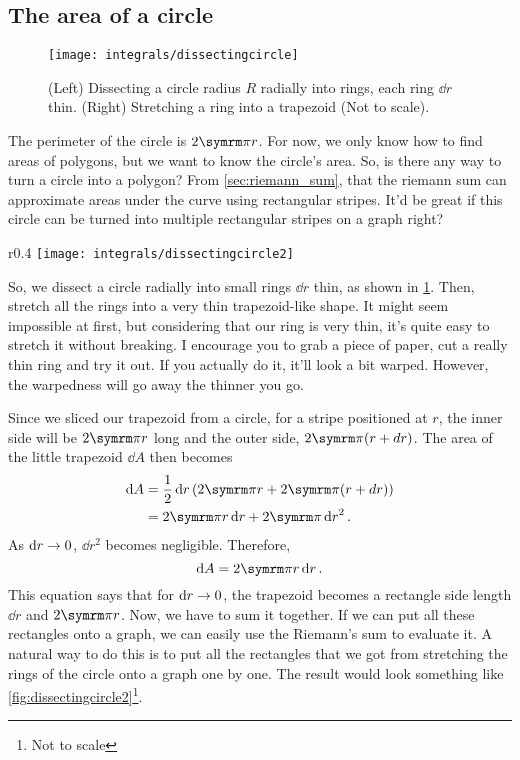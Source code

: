 \subsection{The area of a circle}
\begin{figure}[b]
    \centering
    \texttt{[image: integrals/dissectingcircle]}
    \caption{(Left) Dissecting a circle radius $R$ radially into rings, each ring $\dd{r}$ thin. (Right) Stretching a ring into a trapezoid (Not to scale).}
    \label{fig:dissectingcircle}
\end{figure}

The perimeter of the circle is $2\cpi r$. For now, we only know how to find areas of polygons, but we want to know the circle's area. So, is there any way to turn a circle into a polygon? From \cref{sec:riemann_sum}, that the riemann sum can approximate areas under the curve using rectangular stripes. It'd be great if this circle can be turned into multiple rectangular stripes on a graph right?

\begin{wrapfigure}[]{r}{0.4\textwidth}
    \centering
    \texttt{[image: integrals/dissectingcircle2]}
    \caption{Rearranging all the approximated rectangles onto a graph (Not to scale).}
    \label{fig:dissectingcircle2}
\end{wrapfigure}

So, we dissect a circle radially into small rings $\dd{r}$ thin, as shown in \cref{fig:dissectingcircle}. Then, stretch all the rings into a very thin trapezoid-like shape. It might seem impossible at first, but considering that our ring is very thin, it's quite easy to stretch it without breaking. I encourage you to grab a piece of paper, cut a really thin ring and try it out. If you actually do it, it'll look a bit warped. However, the warpedness will go away the thinner you go.

Since we sliced our trapezoid from a circle, for a stripe positioned at $r$, the inner side will be $2\cpi r$ long and the outer side, $2\cpi (r + dr)$. The area of the little trapezoid $\dd{A}$ then becomes
\begin{align*}
    \dd{A} &= \frac{1}{2}\dd{r}(2\cpi r + 2\cpi (r + dr)) \\
    &= 2\cpi r\dd{r} + 2\cpi\dd{r}^2. 
\end{align*}
As $\dd{r} \rightarrow 0$, $\dd{r}^2$ becomes negligible. Therefore,
\begin{equation}
    \dd{A} = 2\cpi r \dd{r}.
\end{equation}
This equation says that for $\dd{r} \rightarrow 0$, the trapezoid becomes a rectangle side length $\dd{r}$ and $2\cpi r$. Now, we have to sum it together. If we can put all these rectangles onto a graph, we can easily use the Riemann's sum to evaluate it. A natural way to do this is to put all the rectangles that we got from stretching the rings of the circle onto a graph one by one. The result would look something like \cref{fig:dissectingcircle2}\footnote{Not to scale}.

